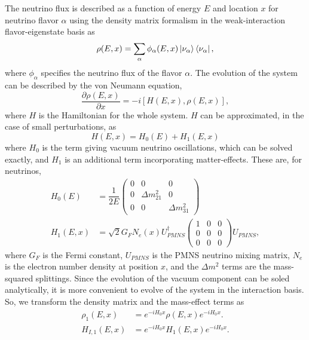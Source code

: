 \documentclass[main.tex]{subfiles}
\begin{document}
The neutrino flux is described as a function of energy $E$ and location $x$ for neutrino flavor $\alpha$ using the density matrix formalism in the weak-interaction flavor-eigenstate basis as 
\begin{equation}
    \rho(E,x) = \sum_{\alpha} \phi_{\alpha}(E,x) \left| \nu_{\alpha} \right >\left< \nu_{\alpha} \right |,
\end{equation}
where $\phi_{\alpha}$ specifies the neutrino flux of the flavor $\alpha$. 
The evolution of the system can be described by the von Neumann equation,
\begin{equation}\label{eq:evol}
    \dfrac{\partial\rho (E,x)}{\partial x} = -i\left[ H(E,x), \rho(E,x)\right],
\end{equation}
where $H$ is the Hamiltonian for the whole system. 
$H$ can be approximated, in the case of small perturbations, as
\begin{equation}
    H(E,x) = H_{0}(E) + H_{1}(E,x)
\end{equation}
where $H_{0}$ is the term giving vacuum neutrino oscillations, which can be solved exactly, and $H_{1}$ is an additional term incorporating matter-effects.
These are, for neutrinos,
\begin{align}
    H_{0}(E) &= \dfrac{1}{2E} \left(\begin{array}{ccc} 0 & 0 & 0\\ 0 & \Delta m_{21}^{2} & 0 \\ 0 & 0 & \Delta m_{31}^{2}\end{array}\right)  \\
    H_{1}(E,x) &= \sqrt{2}G_{F} N_{e}(x) U_{PMNS}^{\dag} \left(\begin{array}{ccc}1&0&0 \\ 0 &0 & 0 \\ 0 & 0 & 0 \end{array}\right) U_{PMNS},
\end{align}
where $G_{F}$ is the Fermi constant, $U_{PMNS}$ is the PMNS neutrino mixing matrix, $N_{e}$ is the electron number density at position $x$, and the $\Delta m^{2}$ terms are the mass-squared splittings.  
Since the evolution of the vacuum component can be soled analytically, it is more convenient to evolve of the system in the interaction basis. 
So, we transform the density matrix and the mass-effect terms as 
\begin{align}
    \rho_{1}(E,x) &= e^{-i H_{0}x}\rho(E,x) e^{-iH_{0}x}. \\
    H_{I,1}(E,x)&= e^{-i H_{0}x} H_{1}(E,x) e^{-iH_{0}x}.
\end{align}
\end{document}
